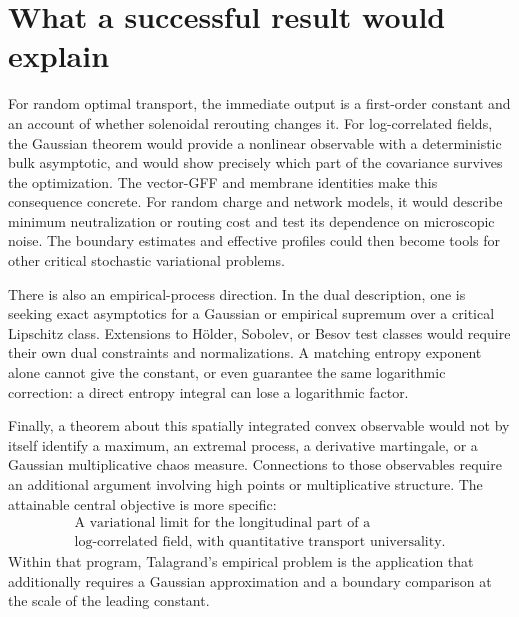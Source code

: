 \documentclass[11pt]{article}
\theoremstyle{definition}
\begin{document}
\section{What a successful result would explain}
\label{sec:meaning}

For random optimal transport, the immediate output is a first-order
constant and an account of whether solenoidal rerouting changes it.
For log-correlated fields, the Gaussian theorem would provide a
nonlinear observable with a deterministic bulk asymptotic, and would
show precisely which part of the covariance survives the optimization.
The vector-GFF and membrane identities make this consequence concrete.
For random charge and network models, it would describe minimum
neutralization or routing cost and test its dependence on microscopic
noise. The boundary estimates and effective profiles could then become
tools for other critical stochastic variational problems.

There is also an empirical-process direction. In the dual description,
one is seeking exact asymptotics for a Gaussian or empirical supremum
over a critical Lipschitz class. Extensions to H\"older, Sobolev, or
Besov test classes would require their own dual constraints and
normalizations. A matching entropy exponent alone cannot give the
constant, or even guarantee the same logarithmic correction: a direct
entropy integral can lose a logarithmic factor.

Finally, a theorem about this spatially integrated convex observable
would not by itself identify a maximum, an extremal process, a
derivative martingale, or a Gaussian multiplicative chaos measure.
Connections to those observables require an additional argument
involving high points or multiplicative structure. The attainable
central objective is more specific:
\[
  \boxed{\begin{gathered}
    \text{A variational limit for the longitudinal part of a}\\
    \text{log-correlated field, with quantitative transport universality.}
  \end{gathered}}
\]
Within that program, Talagrand's empirical problem is the application
that additionally requires a Gaussian approximation and a boundary
comparison at the scale of the leading constant.
\end{document}
